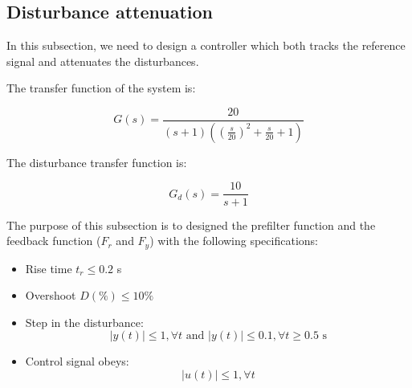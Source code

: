 \subsection{Disturbance attenuation}

In this subsection, we need to design a controller which both tracks the reference signal and attenuates the disturbances. 

The transfer function of the system is:

$$G(s) = \frac{20}{(s+1)((\frac{s}{20})^2+\frac{s}{20}+1)}$$

The disturbance transfer function is:

$$G_d(s) = \frac{10}{s+1}$$

The purpose of this subsection is to designed the prefilter function and the feedback function ($F_r$ and $F_y$) with the following specifications:

\begin{itemize}
    \item Rise time $t_r \leq 0.2$ s
    \item Overshoot $D(\%) \leq 10\%$
    \item Step in the disturbance:
        $$|y(t)| \leq 1, \forall t \text{ and } |y(t)| \leq 0.1, \forall t \geq 0.5\text{ s}$$ 
    \item Control signal obeys:
        $$|u(t)| \leq 1, \forall t$$
\end{itemize}


% 
% 
% 
